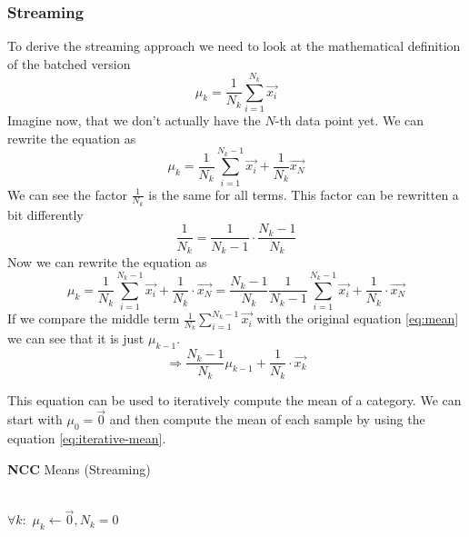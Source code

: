 \documentclass[a4paper]{article}
\begin{document}
\subsubsection{Streaming}
To derive the streaming approach we need to look at the mathematical definition of the batched version
\begin{equation}
  \mu_k = \frac{1}{N_k}\sum^{N_k}_{i=1}\vec{x_i}
\end{equation}
Imagine now, that we don't actually have the $N$-th data point yet.
We can rewrite the equation as
\begin{equation}
  \mu_k = \frac{1}{N_k}\sum^{N_k-1}_{i=1}\vec{x_i} + \frac{1}{N_k}\vec{x_N}
\end{equation}
We can see the factor $\frac{1}{N_k}$ is the same for all terms. This factor can be rewritten a bit differently
\begin{equation}
  \frac{1}{N_k} = \frac{1}{N_k-1} \cdot \frac{N_k-1}{N_k}
\end{equation}
Now we can rewrite the equation as
\begin{equation}
  \mu_k = \frac{1}{N_k}\sum^{N_k-1}_{i=1}\vec{x_i} + \frac{1}{N_k} \cdot \vec{x_N} = \frac{N_k - 1}{N_k}\frac{1}{N_k-1}\sum^{N_k-1}_{i=1}\vec{x_i} + \frac{1}{N_k} \cdot \vec{x_N}
\end{equation}
If we compare the middle term $\frac{1}{N_k}\sum^{N_k-1}_{i=1}\vec{x_i}$ with the original equation \eqref{eq:mean} we can see that it is just $\mu_{k-1}$.
\begin{equation}
  \Rightarrow \frac{N_k - 1}{N_k}\mu_{k-1} + \frac{1}{N_k} \cdot \vec{x_k}
  \label{eq:iterative-mean}
\end{equation}

This equation can be used to iteratively compute the mean of a category. We can start with $\mu_0 = \vec{0}$ and then compute the mean of each sample
by using the equation \eqref{eq:iterative-mean}.
\begin{algorithm}
\LinesNumbered
\caption{\textbf{NCC} Means (Streaming)}\label{alg:ncc_streaming}
\\
$\forall k:$ $\mu_k \gets \vec{0}, N_k = 0$\;
\end{algorithm}
\end{document}
